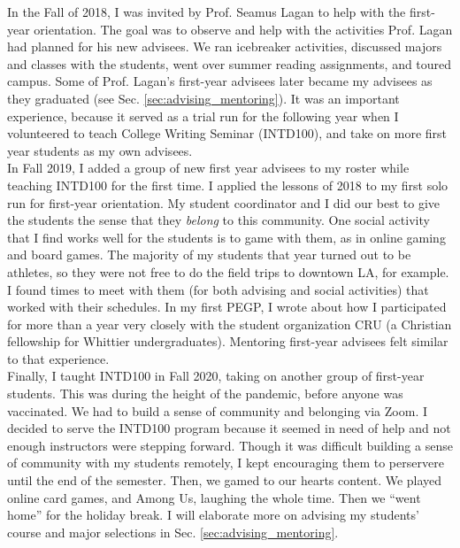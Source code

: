 \documentclass[../../../main.tex]{subfiles}
\begin{document}
\label{sec:first_year}

In the Fall of 2018, I was invited by Prof. Seamus Lagan to help with the first-year orientation.  The goal was to observe and help with the activities Prof. Lagan had planned for his new advisees.  We ran icebreaker activities, discussed majors and classes with the students, went over summer reading assignments, and toured campus.  Some of Prof. Lagan's first-year advisees later became my advisees as they graduated (see Sec. \ref{sec:advising_mentoring}).  It was an important experience, because it served as a trial run for the following year when I volunteered to teach College Writing Seminar (INTD100), and take on more first year students as my own advisees.
\\
\vspace{0.15cm}
In Fall 2019, I added a group of new first year advisees to my roster while teaching INTD100 for the first time.  I applied the lessons of 2018 to my first solo run for first-year orientation.  My student coordinator and I did our best to give the students the sense that they \textit{belong} to this community.  One social activity that I find works well for the students is to game with them, as in online gaming and board games.  The majority of my students that year turned out to be athletes, so they were not free to do the field trips to downtown LA, for example.  I found times to meet with them (for both advising and social activities) that worked with their schedules.  In my first PEGP, I wrote about how I participated for more than a year very closely with the student organization CRU (a Christian fellowship for Whittier undergraduates).  Mentoring first-year advisees felt similar to that experience.
\\
\vspace{0.15cm}
Finally, I taught INTD100 in Fall 2020, taking on another group of first-year students.  This was during the height of the pandemic, before anyone was vaccinated.  We had to build a sense of community and belonging via Zoom.  I decided to serve the INTD100 program because it seemed in need of help and not enough instructors were stepping forward.  Though it was difficult building a sense of community with my students remotely, I kept encouraging them to perservere until the end of the semester.  Then, we gamed to our hearts content.  We played online card games, and Among Us, laughing the whole time.  Then we ``went home'' for the holiday break.  I will elaborate more on advising my students' course and major selections in Sec. \ref{sec:advising_mentoring}.
\end{document}
